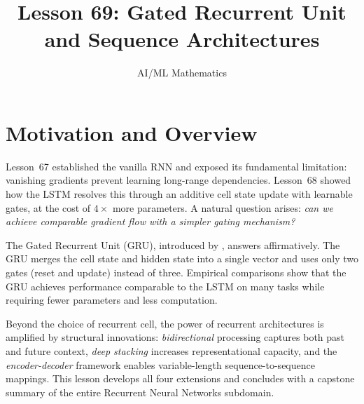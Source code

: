 \documentclass[11pt,a4paper]{article}
\title{Lesson 69: Gated Recurrent Unit\\and Sequence Architectures}
\author{AI/ML Mathematics}
\date{}
\begin{document}
\maketitle
\tableofcontents
\newpage

\section{Motivation and Overview}
\label{sec:motivation}

Lesson~67 established the vanilla RNN and exposed its fundamental
limitation: vanishing gradients prevent learning long-range
dependencies.  Lesson~68 showed how the LSTM resolves this through
an additive cell state update with learnable gates, at the cost of
$4\times$ more parameters.  A natural question arises: \emph{can we
achieve comparable gradient flow with a simpler gating mechanism?}

The Gated Recurrent Unit (GRU), introduced by \citet{cho2014},
answers affirmatively.  The GRU merges the cell state and hidden
state into a single vector and uses only two gates (reset and
update) instead of three.  Empirical comparisons \citep{chung2014}
show that the GRU achieves performance comparable to the LSTM on
many tasks while requiring fewer parameters and less computation.

Beyond the choice of recurrent cell, the power of recurrent
architectures is amplified by structural innovations:
\emph{bidirectional} processing captures both past and future
context, \emph{deep stacking} increases representational capacity,
and the \emph{encoder-decoder} framework enables variable-length
sequence-to-sequence mappings.  This lesson develops all four
extensions and concludes with a capstone summary of the entire
Recurrent Neural Networks subdomain.
\end{document}
